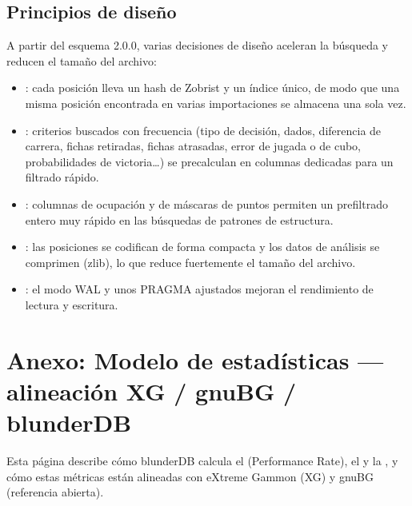 \documentclass[letterpaper,10pt,spanish]{sphinxmanual}
\begin{document}
\subsection{Principios de diseño}
\label{\detokenize{annexe_db_scheme:principes-de-conception}}
\sphinxAtStartPar
A partir del esquema 2.0.0, varias decisiones de diseño aceleran la búsqueda y reducen el tamaño del archivo:
\begin{itemize}
\item {} 
\sphinxAtStartPar
{}: cada posición lleva un hash de Zobrist y un índice único, de modo que una misma posición encontrada en varias importaciones se almacena una sola vez.

\item {} 
\sphinxAtStartPar
{}: criterios buscados con frecuencia (tipo de decisión, dados, diferencia de carrera, fichas retiradas, fichas atrasadas, error de jugada o de cubo, probabilidades de victoria…) se precalculan en columnas dedicadas para un filtrado rápido.

\item {} 
\sphinxAtStartPar
{}: columnas de ocupación y de máscaras de puntos permiten un prefiltrado entero muy rápido en las búsquedas de patrones de estructura.

\item {} 
\sphinxAtStartPar
{}: las posiciones se codifican de forma compacta y los datos de análisis se comprimen (zlib), lo que reduce fuertemente el tamaño del archivo.

\item {} 
\sphinxAtStartPar
{}: el modo WAL y unos PRAGMA ajustados mejoran el rendimiento de lectura y escritura.

\end{itemize}

\sphinxstepscope


\section{Anexo: Modelo de estadísticas — alineación XG / gnuBG / blunderDB}
\label{\detokenize{stats_parity:annexe-modele-de-statistiques-alignement-xg-gnubg-blunderdb}}\label{\detokenize{stats_parity:stats-parity}}\label{\detokenize{stats_parity::doc}}
\sphinxAtStartPar
Esta página describe cómo blunderDB calcula el  (Performance Rate), el  y la , y cómo estas métricas están alineadas con eXtreme Gammon (XG) y gnuBG (referencia abierta).
\end{document}
